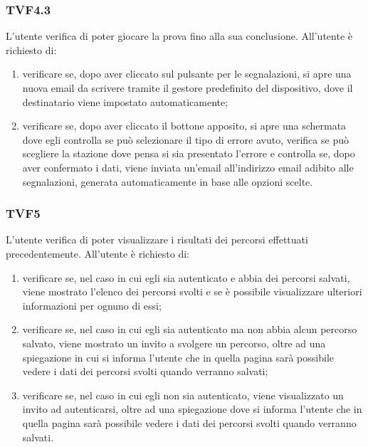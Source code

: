 		\subsubsection{TVF4.3}
			L'utente verifica di poter giocare la prova fino alla sua conclusione.
			All'utente è richiesto di:
			\begin{enumerate}
				\item verificare se, dopo aver cliccato sul pulsante per le segnalazioni, si apre una nuova email da scrivere tramite il gestore predefinito del dispositivo, dove il destinatario viene impostato automaticamente;
				\item verificare se, dopo aver cliccato il bottone apposito, si apre una schermata dove egli controlla se può selezionare il tipo di errore avuto, verifica se può scegliere la stazione dove pensa si sia presentato l'errore e controlla se, dopo aver confermato i dati, viene inviata un'email all'indirizzo email adibito alle segnalazioni, generata automaticamente in base alle opzioni scelte.
			\end{enumerate}
		\subsubsection{TVF5}
			L'utente verifica di poter visualizzare i risultati dei percorsi effettuati precedentemente.
			All'utente è richiesto di:
			\begin{enumerate}
				\item verificare se, nel caso in cui egli sia autenticato e abbia dei percorsi salvati, viene mostrato l'elenco dei percorsi svolti e se è possibile visualizzare ulteriori informazioni per ognuno di essi;
				\item verificare se, nel caso in cui egli sia autenticato ma non abbia alcun percorso salvato, viene mostrato un invito a svolgere un percorso, oltre ad una spiegazione in cui si informa l'utente che in quella pagina sarà possibile vedere i dati dei percorsi svolti quando verranno salvati;
				\item verificare se, nel caso in cui egli non sia autenticato, viene visualizzato un invito ad autenticarsi, oltre ad una spiegazione dove si informa l'utente che in quella pagina sarà possibile vedere i dati dei percorsi svolti quando verranno salvati.
			\end{enumerate}
